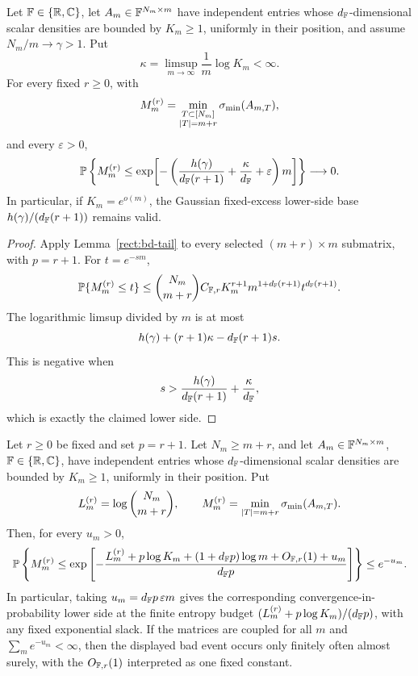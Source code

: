 \begin{theorem}\label{rect:bd-lower}
Let \(\mathbb{F}\in\{\mathbb{R},\mathbb{C}\}\), let \(A_m\in\mathbb{F}^{N_m\times m}\) have independent entries
whose \(d_{\mathbb{F}}\)-dimensional scalar densities are bounded by \(K_m\ge1\), uniformly
in their position, and assume \(N_m/m\to\gamma>1\).  Put
\[
  \kappa=\limsup_{m\to\infty}\frac1m\log K_m<\infty .
\]
For every fixed \(r\ge0\), with
\[
  M_m^{(r)}=\min_{\substack{T\subset[N_m]\\ |T|=m+r}}\sigma_{\min}(A_{m,T}),
\]
and every \(\varepsilon>0\),
\[
  \mathbb{P}\left\{M_m^{(r)}\le
     \exp\!\left[-\left(\frac{h(\gamma)}{d_{\mathbb{F}}(r+1)}
       +\frac{\kappa}{d_{\mathbb{F}}}+\varepsilon\right)m\right]\right\}
  \longrightarrow0.
\]
In particular, if \(K_m=e^{o(m)}\), the Gaussian fixed-excess lower-side base
\(h(\gamma)/(d_{\mathbb{F}}(r+1))\) remains valid.
\end{theorem}

\begin{proof}
Apply Lemma~\ref{rect:bd-tail} to every selected \((m+r)\times m\) submatrix,
with \(p=r+1\).  For \(t=e^{-sm}\),
\[
  \mathbb{P}\{M_m^{(r)}\le t\}
  \le \binom{N_m}{m+r} C_{\mathbb{F},r}K_m^{r+1}
     m^{1+d_{\mathbb{F}}(r+1)}t^{d_{\mathbb{F}}(r+1)} .
\]
The logarithmic limsup divided by \(m\) is at most
\[
  h(\gamma)+(r+1)\kappa-d_{\mathbb{F}}(r+1)s.
\]
This is negative when
\[
  s>\frac{h(\gamma)}{d_{\mathbb{F}}(r+1)}+\frac{\kappa}{d_{\mathbb{F}}},
\]
which is exactly the claimed lower side.
\end{proof}

\begin{corollary}\label{rect:finite-entropy}
Let \(r\ge0\) be fixed and set \(p=r+1\).  Let \(N_m\ge m+r\), and let
\(A_m\in\mathbb{F}^{N_m\times m}\), \(\mathbb{F}\in\{\mathbb{R},\mathbb{C}\}\), have independent entries whose
\(d_{\mathbb{F}}\)-dimensional scalar densities are bounded by \(K_m\ge1\), uniformly in
their position.  Put
\[
  L_m^{(r)}=\log\binom{N_m}{m+r},\qquad
  M_{m}^{(r)}=\min_{|T|=m+r}\sigma_{\min}(A_{m,T}).
\]
Then, for every \(u_m>0\),
\[
  \mathbb{P}\left\{
  M_m^{(r)}
  \le
  \exp\left[-\frac{L_m^{(r)}+p\log K_m+(1+d_{\mathbb{F}} p)\log m+O_{\mathbb{F},r}(1)+u_m}
  {d_{\mathbb{F}} p}\right]
  \right\}
  \le e^{-u_m}.
\]
In particular, taking \(u_m=d_{\mathbb{F}} p\,\varepsilon m\) gives the corresponding
convergence-in-probability lower side at the finite entropy budget
\((L_m^{(r)}+p\log K_m)/(d_{\mathbb{F}} p)\), with any fixed exponential slack.
If the matrices are coupled for all \(m\) and \(\sum_m e^{-u_m}<\infty\), then
the displayed bad event occurs only finitely often almost surely, with the
\(O_{\mathbb{F},r}(1)\) interpreted as one fixed constant.
\end{corollary}

